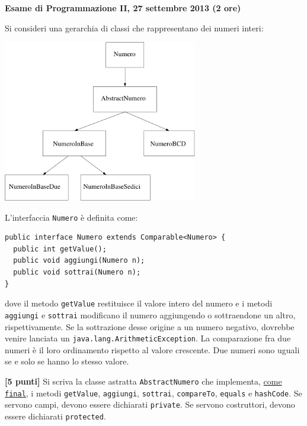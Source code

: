 \documentclass{article}[10pt]
\newcounter{esnu}
\newenvironment{esercizio}{\medskip \noindent {\bf Esercizio\addtocounter{esnu}{1} \arabic{esnu}}}{}
\begin{document}
\begin{center} {\bf Esame di Programmazione II, 27 settembre 2013 (2 ore)}\end{center}

Si consideri una gerarchia di classi che rappresentano dei numeri interi:
%
\begin{center}
\includegraphics[width=8.5cm]{classi.pdf}
\end{center}

\noindent
L'interfaccia \texttt{Numero} \`e definita come:
%
{\small
\begin{verbatim}
public interface Numero extends Comparable<Numero> {
  public int getValue();
  public void aggiungi(Numero n);
  public void sottrai(Numero n);
}
\end{verbatim}
}

\noindent
dove il metodo \texttt{getValue} restituisce il valore intero del numero e i metodi
\texttt{aggiungi} e \texttt{sottrai} modificano il numero aggiungendo o sottraendone un altro,
rispettivamente. Se la sottrazione desse origine a un numero negativo, dovrebbe venire lanciata un
\texttt{java.lang.ArithmeticException}.
La comparazione fra due numeri \`e il loro ordinamento rispetto al valore crescente.
Due numeri sono uguali se e solo se hanno lo stesso valore.

\begin{esercizio}
\textbf{[5 punti]}
Si scriva la classe astratta \texttt{AbstractNumero} che implementa,
\underline{come \texttt{final}}, i metodi
\texttt{getValue}, \texttt{aggiungi}, \texttt{sottrai}, \texttt{compareTo},
\texttt{equals} e \texttt{hashCode}. Se servono campi, devono essere dichiarati \texttt{private}.
Se servono costruttori, devono essere dichiarati \texttt{protected}.
\end{esercizio}
\end{document}

